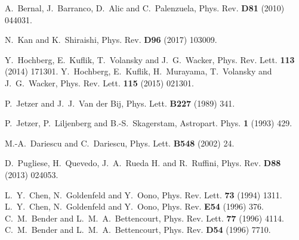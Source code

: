 \documentclass[
aps,prd,
12pt,%
nopreprintnumbers,
showpacs,
eqsecnum,
nofootinbib
]{revtex4-1}
\begin{document}
\begin{thebibliography}{99}
 A.~Bernal, J.~Barranco, D.~Alic and C.~Palenzuela,
Phys. Rev. {\bf D81} (2010) 044031.

 N.~Kan and K.~Shiraishi,
Phys. Rev. {\bf D96} (2017) 103009.

Y.~Hochberg, E.~Kuflik, T.~Volansky and J.~G.~Wacker, 
Phys. Rev. Lett. \textbf{113} (2014) 171301.
Y.~Hochberg, E.~Kuflik, H.~Murayama, T.~Volansky and J.~G.~Wacker, 
Phys. Rev. Lett. \textbf{115} (2015) 021301.

P.~Jetzer and J.~J.~Van der Bij, 
Phys. Lett. {\bf B227} (1989) 341.%

 P.~Jetzer, P.~Liljenberg and B.-S.~Skagerstam,
Astropart. Phys. {\bf 1} (1993) 429.%

M.-A.~Dariescu and C.~Dariescu, 
Phys. Lett. {\bf B548} (2002) 24.%

D.~Pugliese, H.~Quevedo, J.~A.~Rueda H. and R.~Ruffini,
Phys. Rev. {\bf D88} (2013) 024053.

L.~Y.~Chen, N.~Goldenfeld and Y.~Oono,
Phys. Rev. Lett. \textbf{73} (1994) 1311.%
L.~Y.~Chen, N.~Goldenfeld and Y.~Oono,
Phys. Rev. \textbf{E54} (1996) 376.%
C.~M.~Bender and L.~M.~A.~Bettencourt,
Phys. Rev. Lett. \textbf{77} (1996) 4114.%
C.~M.~Bender and L.~M.~A.~Bettencourt,
Phys. Rev. \textbf{D54} (1996) 7710.%

\end{thebibliography}
\end{document}
